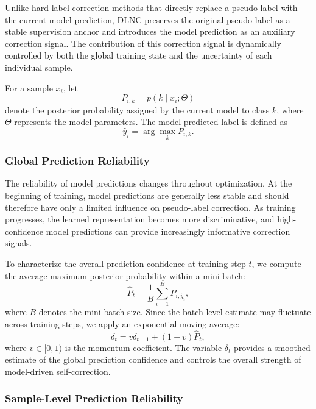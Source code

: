 \documentclass[lettersize,journal]{IEEEtran}
\begin{document}
Unlike hard label correction methods that directly replace a
pseudo-label with the current model prediction, DLNC preserves
the original pseudo-label as a stable supervision anchor and
introduces the model prediction as an auxiliary correction signal.
The contribution of this correction signal is dynamically
controlled by both the global training state and the uncertainty
of each individual sample.

For a sample $x_i$, let
\begin{equation}
P_{i,k}=p(k\mid x_i;\Theta)
\end{equation}
denote the posterior probability assigned by the current model
to class $k$, where $\Theta$ represents the model parameters.
The model-predicted label is defined as
\begin{equation}
\hat{y}_i=\arg\max_k P_{i,k}.
\end{equation}

\subsubsection{Global Prediction Reliability}

The reliability of model predictions changes throughout
optimization. At the beginning of training, model predictions
are generally less stable and should therefore have only a
limited influence on pseudo-label correction. As training
progresses, the learned representation becomes more
discriminative, and high-confidence model predictions can
provide increasingly informative correction signals.

To characterize the overall prediction confidence at training
step $t$, we compute the average maximum posterior probability
within a mini-batch:
\begin{equation}
\hat{P}_t
=
\frac{1}{B}
\sum_{i=1}^{B}
P_{i,\hat{y}_i},
\end{equation}
where $B$ denotes the mini-batch size. Since the batch-level
estimate may fluctuate across training steps, we apply an
exponential moving average:
\begin{equation}
\delta_t
=
v\delta_{t-1}
+
(1-v)\hat{P}_t,
\end{equation}
where $v\in[0,1)$ is the momentum coefficient. The variable
$\delta_t$ provides a smoothed estimate of the global prediction
confidence and controls the overall strength of model-driven
self-correction.

\subsubsection{Sample-Level Prediction Reliability}
\end{document}
